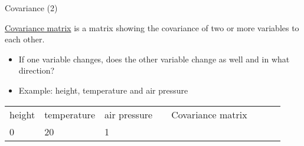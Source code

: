 \documentclass[compress]{beamer}
\providecommand{\tightlist}{%
  \setlength{\itemsep}{0pt}\setlength{\parskip}{0pt}}
\begin{document}
\begin{frame}{Covariance (2)}

\href{http://en.wikipedia.org/wiki/Covariance_matrix}{Covariance matrix}
is a matrix showing the covariance of two or more variables to each
other.

\begin{itemize}
\tightlist
\item
  If one variable changes, does the other variable change as well and in
  what direction?
\item
  Example: height, temperature and air pressure
\end{itemize}

\begin{longtable}[c]{@{}llllllll@{}}
\toprule
\begin{minipage}[t]{0.10\columnwidth}\raggedright\strut
height
\strut\end{minipage} &
\begin{minipage}[t]{0.10\columnwidth}\raggedright\strut
temperature
\strut\end{minipage} &
\begin{minipage}[t]{0.10\columnwidth}\raggedright\strut
air pressure
\strut\end{minipage} &
\begin{minipage}[t]{0.10\columnwidth}\raggedright\strut
\strut\end{minipage} &
\begin{minipage}[t]{0.10\columnwidth}\raggedright\strut
Covariance matrix
\strut\end{minipage} &
\begin{minipage}[t]{0.10\columnwidth}\raggedright\strut
\strut\end{minipage} &
\begin{minipage}[t]{0.10\columnwidth}\raggedright\strut
\strut\end{minipage} &
\begin{minipage}[t]{0.10\columnwidth}\raggedright\strut
\strut\end{minipage}\tabularnewline
\begin{minipage}[t]{0.10\columnwidth}\raggedright\strut
0
\strut\end{minipage} &
\begin{minipage}[t]{0.10\columnwidth}\raggedright\strut
20
\strut\end{minipage} &
\begin{minipage}[t]{0.10\columnwidth}\raggedright\strut
1
\strut\end{minipage} &
\begin{minipage}[t]{0.10\columnwidth}\raggedright\strut

\end{minipage}
\end{longtable}
\end{frame}
\end{document}

